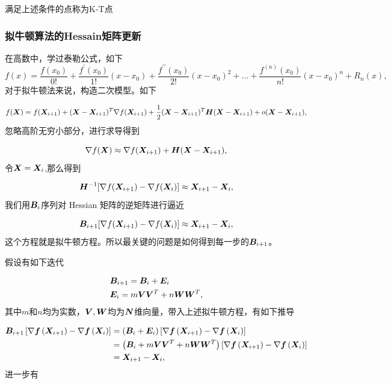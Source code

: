 \documentclass[12pt,oneside,a4paper]{article}
\begin{document}
\noindent 满足上述条件的点称为K-T点

\subsubsection{拟牛顿算法的Hessain矩阵更新}
在高数中，学过泰勒公式，如下
  \begin{equation*}
  f(x)=\frac{f\left(x_{0}\right)}{0 !}+\frac{f^{\prime}\left(x_{0}\right)}{1 !}\left(x-x_{0}\right)+
  \frac{f^{\prime \prime}\left(x_{0}\right)}{2 !}\left(x-x_{0}\right)^{2}+\ldots+
  \frac{f^{(n)}\left(x_{0}\right)}{n !}\left(x-x_{0}\right)^{n}+R_{n}(x),
  \end{equation*}
对于拟牛顿法来说，构造二次模型。如下

\begin{equation*}
f({\boldsymbol X})=f({\boldsymbol X}_{i+1})+({\boldsymbol X}-{\boldsymbol X}_{i+1})^{T} \nabla
f({\boldsymbol X}_{i+1})+\frac{1}{2}({\boldsymbol X}-{\boldsymbol X}_{i+1})^{T} {\boldsymbol H}({\boldsymbol X}-{\boldsymbol X}_{i+1})+o({\boldsymbol X}-{\boldsymbol X}_{i+1}),
\end{equation*}
忽略高阶无穷小部分，进行求导得到

\begin{equation*}
\nabla f({\boldsymbol X}) \approx \nabla f({\boldsymbol X}_{i+1})+{\boldsymbol H}({\boldsymbol X}-{\boldsymbol X}_{i+1}),
\end{equation*}
令${\boldsymbol X} = {\boldsymbol X}_i$,那么得到

\begin{equation*}
{\boldsymbol H}^{-1}[\nabla f({\boldsymbol X}_{i+1})-\nabla f({\boldsymbol X}_{i})] \approx {\boldsymbol X}_{i+1}-{\boldsymbol X}_{i},
\end{equation*}
我们用${\boldsymbol B}_i$序列对 Hessian 矩阵的逆矩阵进行逼近

\begin{equation*}
{\boldsymbol B}_{i+1}[\nabla f({\boldsymbol X}_{i+1})-\nabla f({\boldsymbol X}_{i})] \approx {\boldsymbol X}_{i+1}-{\boldsymbol X}_{i},
\end{equation*}
这个方程就是拟牛顿方程。所以最关键的问题是如何得到每一步的${\boldsymbol B}_{i+1}$。

假设有如下迭代

\begin{align*}
&{\boldsymbol B}_{i+1}={\boldsymbol B}_{i}+{\boldsymbol E}_{i}\\
&{\boldsymbol E}_{i}=m {\boldsymbol V} {\boldsymbol V}^{T}+n {\boldsymbol W} {\boldsymbol W}^{T},
\end{align*}
其中$m$和$n$均为实数，${\boldsymbol V},{\boldsymbol W}$均为${\boldsymbol N}$维向量，带入上述拟牛顿方程，有如下推导

\begin{align*}
{\boldsymbol B}_{i+1}\left[\nabla {\boldsymbol f}\left({\boldsymbol X}_{i+1}\right)-\nabla {\boldsymbol f}\left({\boldsymbol X}_{i}\right)\right] 
&=\left({\boldsymbol B}_{i}+{\boldsymbol E}_{i}\right)\left[\nabla {\boldsymbol f}\left({\boldsymbol X}_{i+1}\right)-\nabla {\boldsymbol f}\left({\boldsymbol X}_{i}\right)\right] \\
&=\left({\boldsymbol B}_{i}+m {\boldsymbol V} {\boldsymbol V}^{T}+n {\boldsymbol W} {\boldsymbol W}^{T}\right)\left[\nabla {\boldsymbol f}\left({\boldsymbol X}_{i+1}\right)-\nabla {\boldsymbol f}\left({\boldsymbol X}_{i}\right)\right] \\
&={\boldsymbol X}_{i+1}-{\boldsymbol X}_{i},
\end{align*}
进一步有
\end{document}
